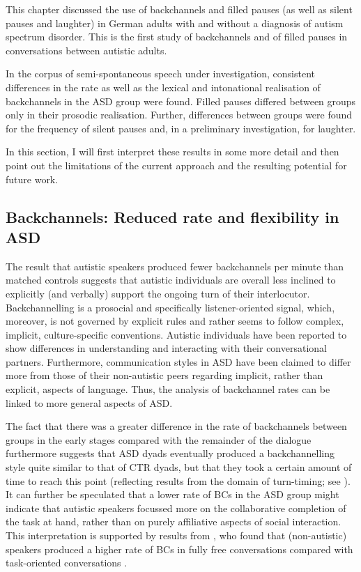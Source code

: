 This chapter discussed the use of backchannels and filled pauses (as well as silent pauses and laughter) in German adults with and without a diagnosis of autism spectrum disorder. This is the first study of backchannels and of filled pauses in conversations between autistic adults.

In the corpus of semi-spontaneous speech under investigation, consistent differences in the rate as well as the lexical and intonational realisation of backchannels in the ASD group were found. Filled pauses differed between groups only in their prosodic realisation. Further, differences between groups were found for the frequency of silent pauses and, in a preliminary investigation, for laughter.

In this section, I will first interpret these results in some more detail and then point out the limitations of the current approach and the resulting potential for future work.


\subsection{Backchannels: Reduced rate and flexibility in ASD}\label{BCFP_Discussion_BC}

The result that autistic speakers produced fewer backchannels per minute than matched controls suggests that autistic individuals are overall less inclined to explicitly (and verbally) support the ongoing turn of their interlocutor. Backchannelling is a prosocial and specifically listener-oriented signal, which, moreover, is not governed by explicit rules and rather seems to follow complex, implicit, culture-specific conventions. Autistic individuals have been reported to show differences in understanding and interacting with their conversational partners. Furthermore, communication styles in ASD have been claimed to differ more from those of their non-autistic peers regarding implicit, rather than explicit, aspects of language. Thus, the analysis of backchannel rates can be linked to more general aspects of ASD.

The fact that there was a greater difference in the rate of backchannels between groups in the early stages compared with the remainder of the dialogue furthermore suggests that ASD dyads eventually produced a backchannelling style quite similar to that of CTR dyads, but that they took a certain amount of time to reach this point (reflecting results from the domain of turn-timing; see ). It can further be speculated that a lower rate of BCs in the ASD group might indicate that autistic speakers focussed more on the collaborative completion of the task at hand, rather than on purely affiliative aspects of social interaction. This interpretation is supported by results from \citet{dideriksenContextualizingConversationalStrategies2019}, who found that (non-autistic) speakers produced a higher rate of BCs in fully free conversations compared with task-oriented conversations \citep[such as Map Tasks; see also][]{janzNavigatingCommonGround2022}.


